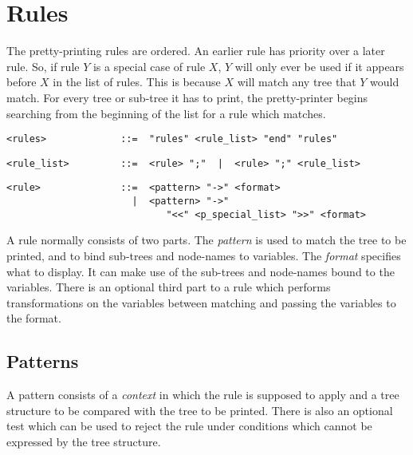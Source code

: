 \section{Rules\label{rules}}

The pretty-printing rules are ordered. An earlier rule has priority over a
later rule. So, if rule $Y$ is a special case of rule $X$, $Y$ will only ever
be used if it appears before $X$ in the list of rules. This is because $X$
will match any tree that $Y$ would match. For every tree or sub-tree it has to
print, the pretty-printer begins searching from the beginning of the list for
a rule which matches.

\begin{small}\begin{verbatim}
<rules>             ::=  "rules" <rule_list> "end" "rules"
\end{verbatim}\end{small}

\begin{small}\begin{verbatim}
<rule_list>         ::=  <rule> ";"  |  <rule> ";" <rule_list>
\end{verbatim}\end{small}

\begin{small}\begin{verbatim}
<rule>              ::=  <pattern> "->" <format>
                      |  <pattern> "->"
                            "<<" <p_special_list> ">>" <format>
\end{verbatim}\end{small}

\noindent
A rule normally consists of two parts. The {\it pattern\/} is used to match
the tree to be printed, and to bind sub-trees and node-names to variables. The
{\it format\/} specifies what to display. It can make use of the sub-trees and
node-names bound to the variables. There is an optional third part to a rule
which performs transformations on the variables between matching and passing
the variables to the format.


\subsection{Patterns\label{patterns}}

A pattern consists of a {\it context\/} in which the rule is supposed to apply
and a tree structure to be compared with the tree to be printed. There is also
an optional test which can be used to reject the rule under conditions which
cannot be expressed by the tree structure.

